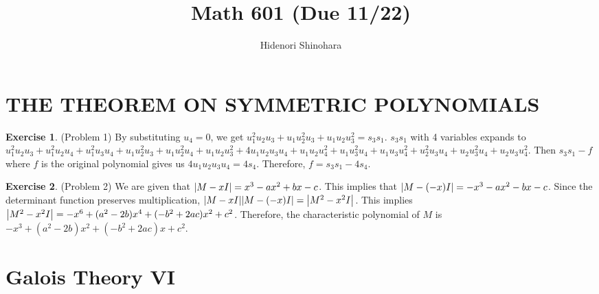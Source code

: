 \documentclass[12pt, psamsfonts]{amsart}
\theoremstyle{definition}
\newtheorem*{exer}{Exercise}
\theoremstyle{remark}
\numberwithin{equation}{section}
\begin{document}
\title{Math 601 (Due 11/22)}
\author{Hidenori Shinohara}
\maketitle

\tableofcontents
\section{THE THEOREM ON SYMMETRIC POLYNOMIALS}

\begin{exer}{(Problem 1)}
  By substituting $u_4 = 0$, we get $u_1^2u_2u_3 + u_1u_2^2u_3 + u_1u_2u_3^2 = s_3s_1$.
  $s_3s_1$ with 4 variables expands to $u_{1}^{2} u_{2} u_{3} + u_{1}^{2} u_{2} u_{4} + u_{1}^{2} u_{3} u_{4} + u_{1} u_{2}^{2} u_{3} + u_{1} u_{2}^{2} u_{4} + u_{1} u_{2} u_{3}^{2} + 4 u_{1} u_{2} u_{3} u_{4} + u_{1} u_{2} u_{4}^{2} + u_{1} u_{3}^{2} u_{4} + u_{1} u_{3} u_{4}^{2} + u_{2}^{2} u_{3} u_{4} + u_{2} u_{3}^{2} u_{4} + u_{2} u_{3} u_{4}^{2}$.
  Then $s_3s_1 - f$ where $f$ is the original polynomial gives us $4u_1u_2u_3u_4 = 4s_4$.
  Therefore, $f = s_3s_1 - 4s_4$.
\end{exer}

\begin{exer}{(Problem 2)}
  We are given that $\abs{M - xI} = x^3 - ax^2 + bx - c$.
  This implies that $\abs{M - (-x)I} = -x^3 - ax^2 - bx - c$.
  Since the determinant function preserves multiplication, $\abs{M - xI}\abs{M - (-x)I} = \abs{M^2 - x^2I}$.
  This implies $\abs{M^2 - x^2I} = -x^6 + (a^2 - 2b)x^4 + (-b^2 + 2ac)x^2 + c^2$.
  Therefore, the characteristic polynomial of $M$ is $-x^3 + (a^2 - 2b)x^2 + (-b^2 + 2ac)x + c^2$.
\end{exer}

\section{Galois Theory VI}
\end{document}
